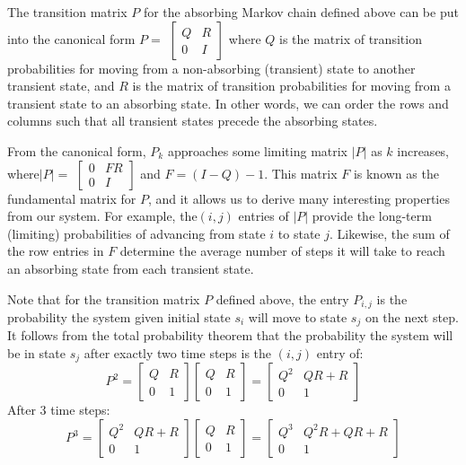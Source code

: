  

The transition matrix \( P\) for the absorbing Markov chain defined above can be put into the canonical form \( P=\)
\(\begin{bmatrix}
Q & R \\
0 & I
\end{bmatrix}\)
  where \(Q\) is the matrix of transition probabilities for moving from a non-absorbing (transient) state to another transient state, and \(R\) is the matrix of transition probabilities for moving from a transient state to an absorbing state. In other words, we can order the rows and columns such that all transient states precede the absorbing states.  

 

From the canonical form, \(P_k\) approaches some limiting matrix \(|P|\) as \(k\) increases, where\( |P|=\)
\(\begin{bmatrix}
0 & FR \\
0 & I
\end{bmatrix}\)
  and \(F = (I-Q)-1\). This matrix \(F\) is known as the fundamental matrix for \(P\), and it allows us to derive many interesting properties from our system. For example, the\( (i, j)\) entries of \(|P|\) provide the long-term (limiting) probabilities of advancing from state \(i\) to state \(j\). Likewise, the sum of the row  entries in \(F\) determine the average number of steps it will take to reach an absorbing state from each transient state. 

Note that for the transition matrix \(P\) defined above, the entry \(P_{i, j}\) is the probability the system given initial state \(s_i\) will move to state \(s_j\) on the next step. It follows from the total probability theorem that the probability the system will be in state \(s_j\) after exactly two time steps is the \((i, j)\) entry of:  
\[
P^2=
\begin{bmatrix}
Q & R \\
0 & 1
\end{bmatrix}
\begin{bmatrix}
Q & R \\
0 & 1
\end{bmatrix}=
\begin{bmatrix}
Q^2 & QR + R \\
0 & 1
\end{bmatrix}
\]
After 3 time steps:
\[
P^3=
\begin{bmatrix}
Q^2 & QR + R \\
0 & 1
\end{bmatrix}
\begin{bmatrix}
Q & R \\
0 & 1
\end{bmatrix}=
\begin{bmatrix}
Q^3 & Q^2R +QR + R \\
0 & 1
\end{bmatrix}
\]

